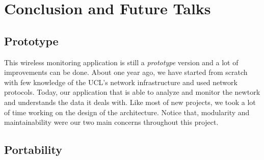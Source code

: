 
\chapter{Conclusion and Future Talks} %

\label{Chapter 7} %


\section{Prototype}
This wireless monitoring application is still a \emph{prototype} version and a lot of improvements can be done. About one year ago, we have started from scratch with few knowledge of the UCL's network infrastructure and used network protocols. Today, our application that is able to analyze and monitor the newtork and understands the data it deals with. Like most of new projects, we took a lot of time working on the design of the architecture. Notice that,  modularity and maintainability were our two main concerns throughout this project.

\section{Portability}



